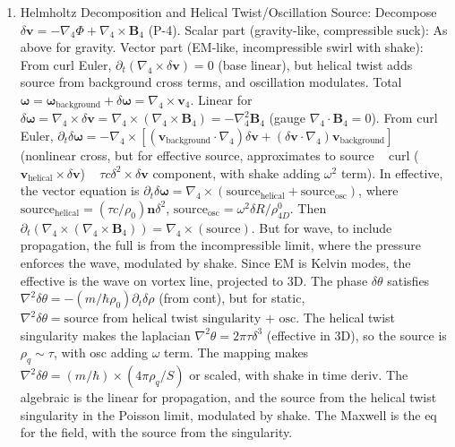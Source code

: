 \begin{enumerate}
\item Helmholtz Decomposition and Helical Twist/Oscillation Source: Decompose $\delta\mathbf{v} = - \nabla_4 \Phi + \nabla_4 \times \mathbf{B}_4$ (P-4). Scalar part (gravity-like, compressible suck): As above for gravity. Vector part (EM-like, incompressible swirl with shake): From curl Euler, $\partial_t (\nabla_4 \times \delta\mathbf{v}) = 0$ (base linear), but helical twist adds source from background cross terms, and oscillation modulates. Total $\boldsymbol{\omega} = \boldsymbol{\omega}_{\text{background}} + \delta\boldsymbol{\omega} = \nabla_4 \times \mathbf{v}_4$. Linear for $\delta\boldsymbol{\omega} = \nabla_4 \times \delta\mathbf{v} = \nabla_4 \times (\nabla_4 \times \mathbf{B}_4) = - \nabla_4^2 \mathbf{B}_4$ (gauge $\nabla_4 \cdot \mathbf{B}_4 = 0$). From curl Euler, $\partial_t \delta\boldsymbol{\omega} = - \nabla_4 \times [(\mathbf{v}_{\text{background}} \cdot \nabla_4) \delta\mathbf{v} + (\delta\mathbf{v} \cdot \nabla_4) \mathbf{v}_{\text{background}}]$ (nonlinear cross, but for effective source, approximates to source ~ curl ($\mathbf{v}_{\text{helical}} \times \delta\mathbf{v}$) ~ $\tau c \delta^2 \times \delta\mathbf{v}$ component, with shake adding $\omega^2$ term). In effective, the vector equation is $\partial_t \delta\boldsymbol{\omega} = \nabla_4 \times (\text{source}_{\text{helical}} + \text{source}_{\text{osc}})$, where $\text{source}_{\text{helical}} = (\tau c / \rho_0) \mathbf{n} \delta^2$, $\text{source}_\text{osc} = \omega^2 \delta R / \rho_{4D}^0$. Then $\partial_t (\nabla_4 \times (\nabla_4 \times \mathbf{B}_4)) = \nabla_4 \times (\text{source})$. But for wave, to include propagation, the full is from the incompressible limit, where the pressure enforces the wave, modulated by shake. Since EM is Kelvin modes, the effective is the wave on vortex line, projected to 3D. The phase $\delta\theta$ satisfies $\nabla^2 \delta\theta = - (m / \hbar \rho_0) \partial_t \delta\rho$ (from cont), but for static, $\nabla^2 \delta\theta = \text{source from helical twist singularity + osc}$. The helical twist singularity makes the laplacian $\nabla^2 \theta = 2\pi \tau \delta^3$ (effective in 3D), so the source is $\rho_q \sim \tau$, with osc adding $\omega$ term. The mapping makes $\nabla^2 \delta\theta = (m / \hbar) \times (4\pi \rho_q / S)$ or scaled, with shake in time deriv. The algebraic is the linear for propagation, and the source from the helical twist singularity in the Poisson limit, modulated by shake. The Maxwell is the eq for the field, with the source from the singularity.
\end{enumerate}

